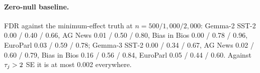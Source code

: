 \begin{table}[H]
\centering
\small
\setlength{\tabcolsep}{2.5pt}
\caption{Power by number of test inputs at $\alpha = 0.1$, resampling: $K = 250$, cap 0.5 $\rightarrow$ $K = 50$, cap 0.9.}
\label{tab:power-full}
\end{table}

\paragraph{Zero-null baseline.} FDR against the minimum-effect truth at $n = 500 / 1{,}000 /
2{,}000$: Gemma-2 SST-2 0.00 / 0.40 / 0.66, AG News 0.01 / 0.50 / 0.80, Bias in Bios 0.00 / 0.78 /
0.96, EuroParl 0.03 / 0.59 / 0.78; Gemma-3 SST-2 0.00 / 0.34 / 0.67, AG News 0.02 / 0.60 / 0.79, Bias
in Bios 0.16 / 0.56 / 0.84, EuroParl 0.05 / 0.44 / 0.60. Against $\tau_j > 2$ SE it is at most 0.002
everywhere.

